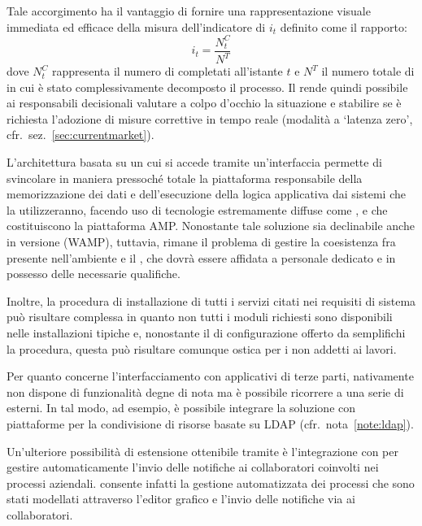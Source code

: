 Tale accorgimento ha il vantaggio di fornire una rappresentazione visuale immediata ed efficace della misura dell'indicatore di  $i_{t}$ definito come il rapporto:
\[
i_{t} = \frac{N^{C}_{t}}{N^{T}}
\]
dove $N^{C}_{t}$ rappresenta il numero di  completati all'istante $t$ e $N^{T}$ il numero totale di  in cui è stato complessivamente decomposto il processo. Il \sw rende quindi possibile ai responsabili decisionali valutare a colpo d'occhio la situazione e stabilire se è richiesta l'adozione di misure correttive in tempo reale (modalità a `latenza zero', cfr.~sez.~\ref{sec:currentmarket}).

L'architettura basata su un  cui si accede tramite un'interfaccia  permette di svincolare in maniera pressoché totale la piattaforma \sw responsabile della memorizzazione dei dati e dell'esecuzione della logica applicativa dai sistemi  che la utilizzeranno, facendo uso di tecnologie estremamente diffuse come ,  e  che costituiscono la piattaforma AMP\@. Nonostante tale soluzione sia declinabile anche in versione  (WAMP), tuttavia, rimane il problema di gestire la coesistenza fra  presente nell'ambiente  e il  , che dovrà essere affidata a personale dedicato e in possesso delle necessarie qualifiche.

Inoltre, la procedura di installazione di tutti i servizi citati nei requisiti di sistema può risultare complessa in quanto non tutti i moduli richiesti sono disponibili nelle installazioni tipiche e, nonostante il  di configurazione offerto da \progname semplifichi la procedura, questa può risultare comunque ostica per i non addetti ai lavori.

Per quanto concerne l'interfacciamento con applicativi di terze parti, \progname nativamente non dispone di funzionalità degne di nota ma è possibile ricorrere a una serie di  esterni. In tal modo, ad esempio, è possibile integrare la soluzione con piattaforme per la condivisione di risorse basate su LDAP (cfr.~nota~\ref{note:ldap}).

Un'ulteriore possibilità di estensione ottenibile tramite  è l'integrazione con  per gestire automaticamente l'invio delle notifiche ai collaboratori coinvolti nei processi aziendali. \progname consente infatti la gestione automatizzata dei processi che sono stati modellati attraverso l'editor grafico e l'invio delle notifiche	via  ai collaboratori.

